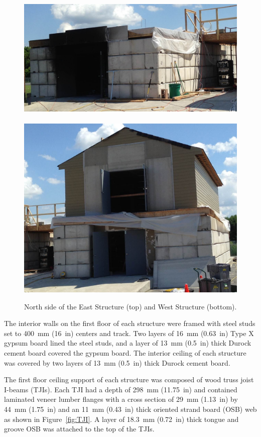 \begin{figure}
	\centering
	\includegraphics[width=5.25in]{Figures/Pictures/east_structure}
	\\~\\
	\includegraphics[width=5.25in]{Figures/Pictures/west_structure}
	\caption[North side of the East and West Structures]{North side of the East Structure (top) and West Structure (bottom).}
	\label{fig:struct_pics}
\end{figure}

The interior walls on the first floor of each structure were framed with steel studs set to 400~mm (16~in) centers and track. Two layers of 16~mm (0.63~in) Type X gypsum board lined the steel studs, and a layer of 13~mm (0.5~in) thick Durock cement board covered the gypsum board. The interior ceiling of each structure was covered by two layers of 13~mm (0.5~in) thick Durock cement board.

The first floor ceiling support of each structure was composed of wood truss joist I-beams (TJIs). Each TJI had a depth of 298~mm (11.75~in) and contained laminated veneer lumber flanges with a cross section of 29~mm (1.13~in) by 44~mm (1.75~in) and an 11~mm (0.43~in) thick oriented strand board (OSB) web as shown in Figure~\ref{fig:TJI}. A layer of 18.3~mm (0.72~in) thick tongue and groove OSB was attached to the top of the TJIs.

